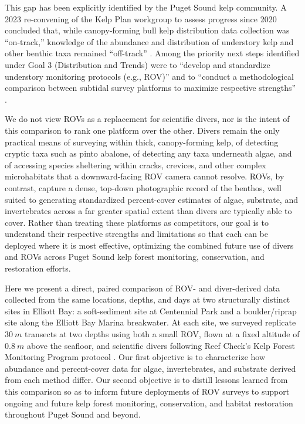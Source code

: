 \documentclass[11pt]{article}
\begin{document}
This gap has been explicitly identified by the Puget Sound kelp community.
A 2023 re-convening of the Kelp Plan workgroup to assess progress since 2020 concluded that, while canopy-forming bull kelp distribution data collection was ``on-track,'' knowledge of the abundance and distribution of understory kelp and other benthic taxa remained ``off-track'' \citep{Whitty:2023aa}.
Among the priority next steps identified under Goal 3 (Distribution and Trends) were to ``develop and standardize understory monitoring protocols (e.g., ROV)'' and to ``conduct a methodological comparison between subtidal survey platforms to maximize respective strengths'' \citep{Whitty:2023aa}.

We do not view ROVs as a replacement for scientific divers, nor is the intent 
of this comparison to rank one platform over the other. 
Divers remain the only practical means of surveying within thick,
canopy-forming kelp, of detecting cryptic taxa such as pinto abalone, of
detecting any taxa underneath algae, and of accessing species sheltering within
cracks, crevices, and other complex microhabitats that a downward-facing ROV
camera cannot resolve.
ROVs, by contrast, capture a dense, top-down photographic record of the 
benthos, well suited to generating standardized percent-cover estimates of 
algae, substrate, and invertebrates across a far greater spatial extent than 
divers are typically able to cover. 
Rather than treating these platforms as competitors, our goal is to understand their respective strengths and limitations so that each can be deployed where it is most effective, optimizing the combined future use of divers and ROVs across Puget Sound kelp forest monitoring, conservation, and restoration efforts.

Here we present a direct, paired comparison of ROV- and diver-derived data 
collected from the same locations, depths, and days at two structurally 
distinct sites in Elliott Bay: a soft-sediment site at Centennial Park and a 
boulder/riprap site along the Elliott Bay Marina breakwater.
At each site, we surveyed replicate $30~m$ transects at two depths using 
both a small ROV, flown at a fixed altitude of $0.8~m$ above the seafloor, and 
scientific divers following Reef Check's Kelp Forest Monitoring Program 
protocol \citep{ReefCheckCalifornia:2021aa}.
Our first objective is to characterize how abundance and percent-cover data for 
algae, invertebrates, and substrate derived from each method differ.
Our second objective is to distill lessons learned from this comparison so as to 
inform future deployments of ROV surveys to support ongoing and future kelp 
forest monitoring, conservation, and habitat restoration throughout Puget 
Sound and beyond. 
\end{document}
